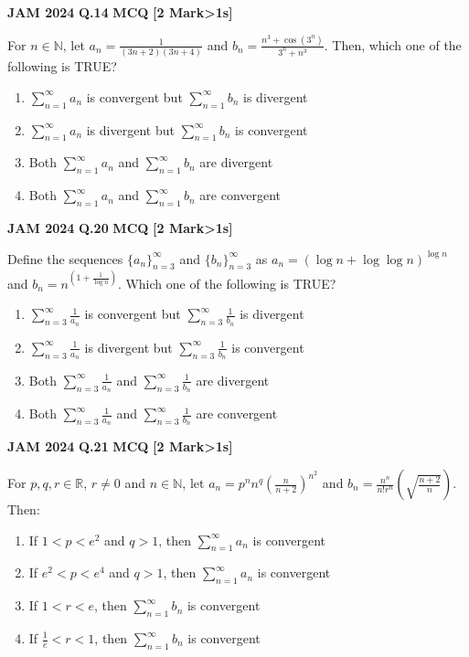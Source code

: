 \documentclass[11pt,a4paper]{article}
\newcommand{\pyqheader}[4]{%
    \noindent\begin{tcolorbox}[
        colback=badgebg,
        colframe=secondary,
        arc=2mm,
        boxrule=0.6pt,
        top=1.5mm,bottom=1.5mm,left=2mm,right=2mm
    ]
        \textbf{\textcolor{primary}{JAM #1}} \hfill \textbf{Q.#2} \hfill \textsc{\textbf{#3}} \hfill \textbf{[#4 Mark\ifnum#4>1s\fi]}
    \end{tcolorbox}\vspace{-1mm}
}
\begin{document}
\pyqheader{2024}{14}{MCQ}{2}
For $n\in\mathbb{N}$, let $a_{n}=\frac{1}{(3n+2)(3n+4)}$ and $b_{n}=\frac{n^{3}+\cos(3^{n})}{3^{n}+n^{3}}$. Then, which one of the following is TRUE?
\begin{enumerate}[label=(\Alph*)]
    \item $\sum_{n=1}^{\infty} a_n$ is convergent but $\sum_{n=1}^{\infty} b_n$ is divergent
    \item $\sum_{n=1}^{\infty} a_n$ is divergent but $\sum_{n=1}^{\infty} b_n$ is convergent
    \item Both $\sum_{n=1}^{\infty} a_n$ and $\sum_{n=1}^{\infty} b_n$ are divergent
    \item Both $\sum_{n=1}^{\infty} a_n$ and $\sum_{n=1}^{\infty} b_n$ are convergent
\end{enumerate}

\pyqheader{2024}{20}{MCQ}{2}
Define the sequences $\{a_{n}\}_{n=3}^{\infty}$ and $\{b_{n}\}_{n=3}^{\infty}$ as $a_{n}=(\log n+\log\log n)^{\log n}$ and $b_{n}=n^{(1+\frac{1}{\log n})}$. Which one of the following is TRUE?
\begin{enumerate}[label=(\Alph*)]
    \item $\sum_{n=3}^{\infty} \frac{1}{a_n}$ is convergent but $\sum_{n=3}^{\infty} \frac{1}{b_n}$ is divergent
    \item $\sum_{n=3}^{\infty} \frac{1}{a_n}$ is divergent but $\sum_{n=3}^{\infty} \frac{1}{b_n}$ is convergent
    \item Both $\sum_{n=3}^{\infty} \frac{1}{a_n}$ and $\sum_{n=3}^{\infty} \frac{1}{b_n}$ are divergent
    \item Both $\sum_{n=3}^{\infty} \frac{1}{a_n}$ and $\sum_{n=3}^{\infty} \frac{1}{b_n}$ are convergent
\end{enumerate}

\pyqheader{2024}{21}{MCQ}{2}
For $p,q,r\in\mathbb{R}$, $r\ne 0$ and $n\in\mathbb{N}$, let $a_{n}=p^{n}n^{q}\left(\frac{n}{n+2}\right)^{n^{2}}$ and $b_{n}=\frac{n^{n}}{n!r^{n}}\left(\sqrt{\frac{n+2}{n}}\right)$. Then:
\begin{enumerate}[label=(\Alph*)]
    \item If $1<p<e^{2}$ and $q>1$, then $\sum_{n=1}^{\infty} a_{n}$ is convergent
    \item If $e^{2}<p<e^{4}$ and $q>1$, then $\sum_{n=1}^{\infty} a_{n}$ is convergent
    \item If $1<r<e$, then $\sum_{n=1}^{\infty} b_{n}$ is convergent
    \item If $\frac{1}{e}<r<1$, then $\sum_{n=1}^{\infty} b_{n}$ is convergent
\end{enumerate}
\end{document}
